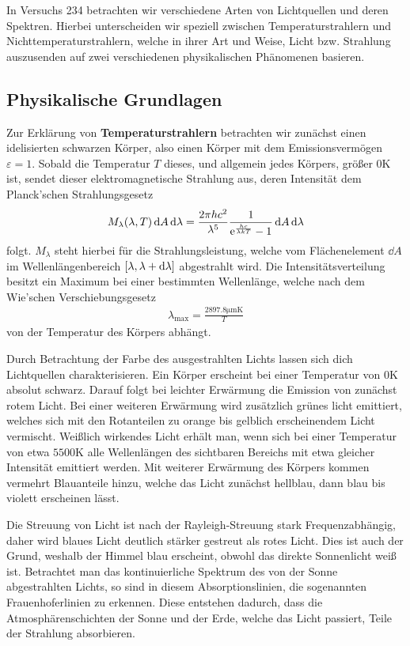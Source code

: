 In Versuchs 234 betrachten wir verschiedene Arten von Lichtquellen und deren Spektren. Hierbei unterscheiden wir speziell zwischen Temperaturstrahlern und Nichttemperaturstrahlern, welche in ihrer Art und Weise, Licht bzw. Strahlung auszusenden auf zwei verschiedenen physikalischen Phänomenen basieren.

\subsection{Physikalische Grundlagen}

Zur Erklärung von \textbf{Temperaturstrahlern} betrachten wir zunächst einen idelisierten schwarzen Körper, also einen Körper mit dem Emissionsvermögen $\varepsilon = 1$. Sobald die Temperatur $T$ dieses, und allgemein jedes Körpers, größer $0 \si{\kelvin}$ ist, sendet dieser elektromagnetische Strahlung aus, deren Intensität dem Planck'schen Strahlungsgesetz
\begin{align}
  M_{\lambda} (\lambda, T) \dd{A} \dd{\lambda} = \frac{2 \pi h c^2}{\lambda^5} \frac{1}{\text{e}^{\frac{hc}{\lambda k T}} - 1} \dd{A} \dd{\lambda}
\end{align}
folgt. $M_{\lambda}$ steht hierbei für die Strahlungsleistung, welche vom Flächenelement $\dd{A}$ im Wellenlängenbereich $\qty[\lambda, \lambda + \dd{\lambda}]$ abgestrahlt wird. Die Intensitätsverteilung besitzt ein Maximum bei einer bestimmten Wellenlänge, welche nach dem Wie'schen Verschiebungsgesetz
\begin{align}
  \lambda_{\max} = \frac{2897.8 \si{\micro\meter\kelvin}}{T}
\end{align}
von der Temperatur des Körpers abhängt.

Durch Betrachtung der Farbe des ausgestrahlten Lichts lassen sich dich Lichtquellen charakterisieren. Ein Körper erscheint bei einer Temperatur von $0\si{\kelvin}$ absolut schwarz. Darauf folgt bei leichter Erwärmung die Emission von zunächst rotem Licht. Bei einer weiteren Erwärmung wird zusätzlich grünes licht emittiert, welches sich mit den Rotanteilen zu orange bis gelblich erscheinendem Licht vermischt. Weißlich wirkendes Licht erhält man, wenn sich bei einer Temperatur von etwa $5500 \si{\kelvin}$ alle Wellenlängen des sichtbaren Bereichs mit etwa gleicher Intensität emittiert werden. Mit weiterer Erwärmung des Körpers kommen vermehrt Blauanteile hinzu, welche das Licht zunächst hellblau, dann blau bis violett erscheinen lässt.

Die Streuung von Licht ist nach der Rayleigh-Streuung stark Frequenzabhängig, daher wird blaues Licht deutlich stärker gestreut als rotes Licht. Dies ist auch der Grund, weshalb der Himmel blau erscheint, obwohl das direkte Sonnenlicht weiß ist. Betrachtet man das kontinuierliche Spektrum des von der Sonne abgestrahlten Lichts, so sind in diesem Absorptionslinien, die sogenannten Frauenhoferlinien zu erkennen. Diese entstehen dadurch, dass die Atmosphärenschichten der Sonne und der Erde, welche das Licht passiert, Teile der Strahlung absorbieren.
 
